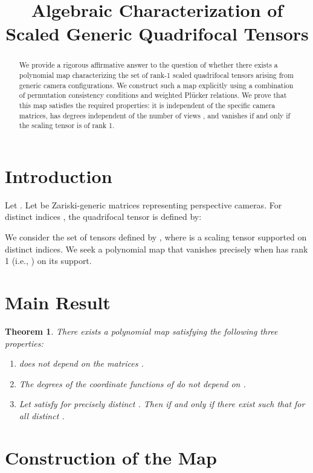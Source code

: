 \documentclass[12pt]{article}
\newtheorem{theorem}{Theorem}
\theoremstyle{definition}
\begin{document}
\title{Algebraic Characterization of Scaled Generic Quadrifocal Tensors}
\author{}
\date{}
\maketitle

\begin{abstract}
We provide a rigorous affirmative answer to the question of whether there exists a polynomial map characterizing the set of rank-1 scaled quadrifocal tensors arising from generic camera configurations. We construct such a map  explicitly using a combination of permutation consistency conditions and weighted Plücker relations. We prove that this map satisfies the required properties: it is independent of the specific camera matrices, has degrees independent of the number of views , and vanishes if and only if the scaling tensor is of rank 1.
\end{abstract}

\section{Introduction}

Let . Let  be Zariski-generic matrices representing  perspective cameras. For distinct indices , the quadrifocal tensor  is defined by:

We consider the set of tensors  defined by , where  is a scaling tensor supported on distinct indices. We seek a polynomial map  that vanishes precisely when  has rank 1 (i.e., ) on its support.

\section{Main Result}

\begin{theorem}
There exists a polynomial map  satisfying the following three properties:
\begin{enumerate}
\item  does not depend on the matrices .
\item The degrees of the coordinate functions of  do not depend on .
\item Let  satisfy  for precisely distinct . Then  if and only if there exist  such that  for all distinct .
\end{enumerate}
\end{theorem}

\section{Construction of the Map }
\end{document}

